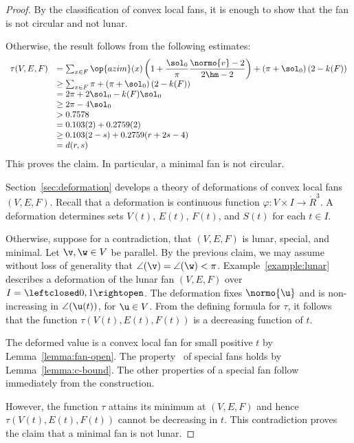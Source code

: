 \begin{proof}
By the classification of convex local fans, it is enough to show that the fan is not circular and not lunar.

Otherwise, the result follows from the following estimates:
\begin{displaymath}
\begin{array}{lll}
  \tau(V,E,F) &=\sum_{x\in F} \op{azim}(x)
  \left(1 + \dfrac{\sol_0}{\pi}  \dfrac{\normo{v}-2}{2\hm-2}\right) 
+ \left(\pi+{\sol_0}\right) (2- k(F))\\
  &\ge \sum_{x\in F} \pi + \left(\pi+{\sol_0}\right) (2- k(F))\\
  &= 2\pi + 2\sol_0 - k(F) \sol_0\\
  &\ge 2\pi - 4\sol_0\\
  &> 0.7578\\
  &=0.103 (2) + 0.2759 (2)\\
  &\ge 0.103 (2-s) + 0.2759 (r+2s-4) \\ 
  &= d(r,s)\\
\end{array}
\end{displaymath}
This proves the claim.  In particular, a minimal fan is not circular.


Section~\ref{sec:deformation} develops a theory of deformations of
convex local fans $(V,E,F)$.  Recall that a deformation is continuous
function $\varphi:V\times I\to\ring{R}^3$.  A deformation determines
sets $V(t)$, $E(t)$, $F(t)$, and $S(t)$ for each $t\in I$.


  Otherwise, suppose for a
contradiction, that $(V,E,F)$ is lunar, special, and minimal.  Let
$\v,\w\in V$ be parallel.  By the previous claim, we may assume
without loss of generality that $\angle(\v)=\angle(\w)<\pi$.
Example~\ref{example:lunar} describes a deformation of the lunar fan
$(V,E,F)$ over $I=\leftclosed0,1\rightopen$.  The deformation fixes
$\normo{\u}$ and is non-increasing in $\angle(\u(t))$, for $\u\in V$.
From the defining formula for $\tau$, it follows that the function
$\tau(V(t),E(t),F(t))$ is a decreasing function of $t$.

  The deformed value is a convex local fan for small positive
$t$ by Lemma~\ref{lemma:fan-open}.  The property~ of
special fans holds by Lemma~\ref{lemma:c-bound}.  The other properties
of a special fan follow immediately from the construction.

However, the function $\tau$ attains its minimum at $(V,E,F)$ and
hence $\tau(V(t),E(t),F(t))$ cannot be decreasing in $t$.  This
contradiction proves the claim that a minimal fan is not lunar.
\end{proof}

